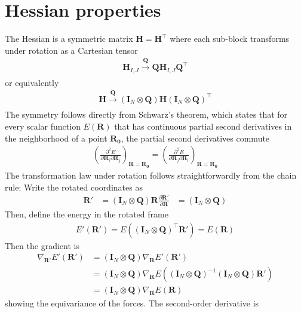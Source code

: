 \documentclass[pdflatex,sn-mathphys-num]{sn-jnl}%
\begin{document}
\section{Hessian properties}
\label{sec:hessian_properties}
The Hessian is a symmetric matrix $\mathbf{H}=\mathbf{H}^\top$ where each sub-block transforms under rotation as a Cartesian tensor
\begin{align}
    \mathbf{H}_{I,J} \xrightarrow[]{\mathbf{Q}} \mathbf{Q} \mathbf{H}_{I,J} \mathbf{Q}^\top 
\end{align}
or equivalently
\begin{align}
    \mathbf{H} \xrightarrow[]{\mathbf{Q}} (\mathbf{I}_{N} \otimes \mathbf{Q})\mathbf{H} (\mathbf{I}_{N} \otimes \mathbf{Q})^\top 
\end{align}
The symmetry follows directly from Schwarz's theorem, which states that for every scalar function $E(\mathbf{R})$ that has continuous partial second derivatives in the neighborhood of a point $\mathbf{R_0}$, the partial second derivatives commute
\begin{align}
    \left(\frac{\partial^2 E}{\partial \mathbf{R}_i \partial \mathbf{R}_j}\right)_{\mathbf{R}=\mathbf{R_0}} = \left(\frac{\partial^2 E}{\partial \mathbf{R}_j \partial \mathbf{R}_i}\right)_{\mathbf{R}=\mathbf{R_0}}
\end{align}
The transformation law under rotation follows straightforwardly from the chain rule: 
Write the rotated coordinates as
\begin{align}
    \mathbf{R}' &= (\mathbf{I}_{N} \otimes \mathbf{Q}) \mathbf{R} 
    \frac{\partial \mathbf{R}'}{\partial \mathbf{R}} &= (\mathbf{I}_{N} \otimes \mathbf{Q})
\end{align}
Then, define the energy in the rotated frame
\begin{align}
    E'(\mathbf{R}') = E((\mathbf{I}_{N} \otimes \mathbf{Q})^\top \mathbf{R}') = E(\mathbf{R})
\end{align}
Then the gradient is
\begin{align}
    \nabla_\mathbf{R'}E'(\mathbf{R'}) &= (\mathbf{I}_{N} \otimes \mathbf{Q}) \nabla_\mathbf{R} E'(\mathbf{R}') \\
    &= (\mathbf{I}_{N} \otimes \mathbf{Q}) \nabla_\mathbf{R} E((\mathbf{I}_{N} \otimes \mathbf{Q})^{-1} (\mathbf{I}_{N} \otimes \mathbf{Q}) \mathbf{R}') \\
    &= (\mathbf{I}_{N} \otimes \mathbf{Q}) \nabla_\mathbf{R} E(\mathbf{R})
\end{align}
showing the equivariance of the forces. The second-order derivative is
\end{document}
